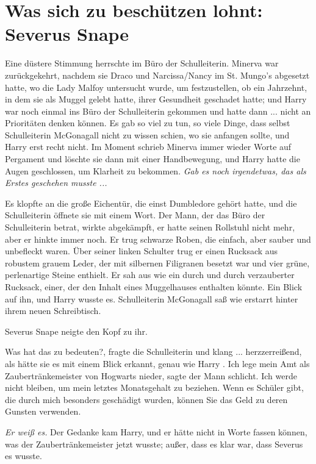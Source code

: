 \chapter{Was sich zu beschützen lohnt: Severus Snape}

Eine düstere Stimmung herrschte im Büro der Schulleiterin. Minerva war
zurückgekehrt, nachdem sie Draco und Narcissa/Nancy im St. Mungo's abgesetzt
hatte, wo die Lady Malfoy untersucht wurde, um festzustellen, ob ein Jahrzehnt,
in dem sie als Muggel gelebt hatte, ihrer Gesundheit geschadet hatte; und Harry
war noch einmal ins Büro der Schulleiterin gekommen und hatte dann ... nicht an
Prioritäten denken können. Es gab so viel zu tun, so viele Dinge, dass selbst
Schulleiterin McGonagall nicht zu wissen schien, wo sie anfangen sollte, und
Harry erst recht nicht. Im Moment schrieb Minerva immer wieder Worte auf
Pergament und löschte sie dann mit einer Handbewegung, und Harry hatte die Augen
geschlossen, um Klarheit zu bekommen. \emph{ Gab es noch irgendetwas, das als
Erstes geschehen musste ...}

Es klopfte an die große Eichentür, die einst Dumbledore gehört hatte, und die
Schulleiterin öffnete sie mit einem Wort. Der Mann, der das Büro der
Schulleiterin betrat, wirkte abgekämpft, er hatte seinen Rollstuhl nicht mehr,
aber er hinkte immer noch. Er trug schwarze Roben, die einfach, aber sauber und
unbefleckt waren. Über seiner linken Schulter trug er einen Rucksack aus
robustem grauem Leder, der mit silbernen Filigranen besetzt war und vier grüne,
perlenartige Steine enthielt. Er sah aus wie ein durch und durch verzauberter
Rucksack, einer, der den Inhalt eines Muggelhauses enthalten könnte. Ein Blick
auf ihn, und Harry wusste es. Schulleiterin McGonagall saß wie erstarrt hinter
ihrem neuen Schreibtisch.

Severus Snape neigte den Kopf zu ihr.

\glqq{}Was hat das zu bedeuten?\grqq{}, fragte die Schulleiterin und klang ...
herzzerreißend, als hätte sie es mit einem Blick erkannt, genau wie Harry .
\glqq{}Ich lege mein Amt als Zaubertränkemeister von Hogwarts nieder\grqq{},
sagte der Mann schlicht. \glqq{}Ich werde nicht bleiben, um mein letztes
Monatsgehalt zu beziehen. Wenn es Schüler gibt, die durch mich besonders
geschädigt wurden, können Sie das Geld zu deren Gunsten verwenden.\grqq{}

\emph{Er weiß es.}
Der Gedanke kam Harry, und er hätte nicht in Worte fassen können, was der
Zaubertränkemeister jetzt wusste; außer, dass es klar war, dass Severus es
wusste.

